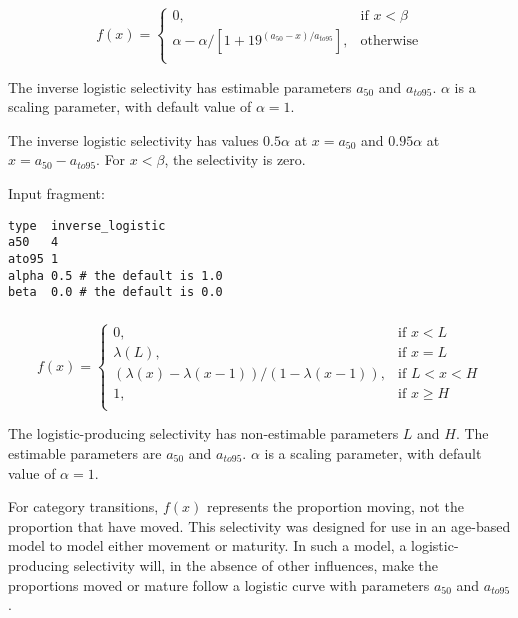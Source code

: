 \begin{equation}
  f(x) = \begin{cases}
	0, & \text{if $x < \beta$} \\
    \alpha - \alpha / [1+19^{(a_{50}-x)/a_{to95}}], & \text{otherwise} \\
   \end{cases}
\end{equation}

The inverse logistic selectivity has estimable parameters $a_{50}$ and $a_{to95}$. $\alpha$ is a scaling parameter, with default value of $\alpha = 1$. 

The inverse logistic selectivity has values $0.5 \alpha$ at $x=a_{50}$ and $0.95 \alpha$ at $x=a_{50}-a_{to95}$. For $x < \beta$, the selectivity is zero.


Input fragment: {\small{\begin{verbatim}
type  inverse_logistic
a50   4
ato95 1
alpha 0.5 # the default is 1.0
beta  0.0 # the default is 0.0
\end{verbatim}}}

\subsubsection[Logistic producing]{}\label{sec:Selectivity-LogisticProducing}

\begin{equation}
f(x)=\begin{cases}
	  0, & \text{if $x < L$} \\
	  \lambda(L), & \text{if $x=L$} \\
	  \left( \lambda(x)-\lambda(x-1) \right) / \left( 1-\lambda(x-1) \right), & \text{if $L < x < H$} \\
	  1, & \text{if $x \ge H$} \\
  \end{cases}
\end{equation}

The logistic-producing selectivity has non-estimable parameters $L$ and $H$. The estimable parameters are $a_{50}$ and $a_{to95}$. $\alpha$ is a scaling parameter, with default value of $\alpha = 1$.

For category transitions, $f(x)$ represents the proportion moving, not the proportion that have moved. This selectivity was designed for use in an age-based model to model either movement or maturity. In such a model, a logistic-producing  selectivity will, in the absence of other influences, make the proportions moved or mature follow a logistic curve with parameters $a_{50}$ and $a_{to95}$.

